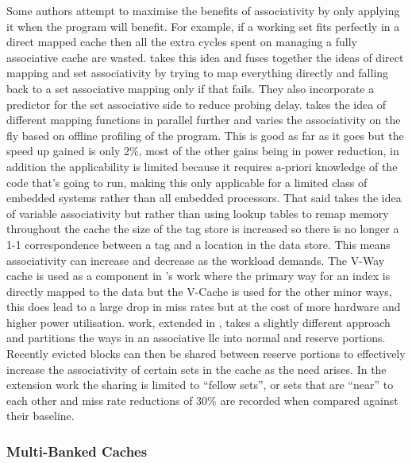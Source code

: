 Some authors attempt to maximise the benefits of associativity by only applying it when the program will benefit. For example, if a working set fits perfectly in a direct mapped cache then all the extra cycles spent on managing a fully associative cache are wasted. \citet{batsonReactiveassociativeCaches2001} takes this idea and fuses together the ideas of direct mapping and set associativity by trying to map everything directly and falling back to a set associative mapping only if that fails. They also incorporate a predictor for the set associative side to reduce probing delay. \citet{alyVariablewaySetAssociative2003} takes the idea of different mapping functions in parallel further and varies the associativity on the fly based on offline profiling of the program. This is good as far as it goes but the speed up gained is only 2\%, most of the other gains being in power reduction, in addition the applicability is limited because it requires a-priori knowledge of the code that's going to run, making this only applicable for a limited class of embedded systems rather than all embedded processors. That said \citet{qureshiVWayCacheDemandbased2005} takes the idea of variable associativity but rather than using lookup tables to remap memory throughout the cache the size of the tag store is increased so there is no longer a 1-1 correspondence between a tag and a location in the data store. This means associativity can increase and decrease as the workload demands. The V-Way cache is used as a component in \citet{deepikaHybridwayCacheMobile2011}'s work where the primary way for an index is directly mapped to the data but the V-Cache is used for the other minor ways, this does lead to a large drop in miss rates but at the cost of more hardware and higher power utilisation. \citet{dasVictimRetentionReducing2014} work, extended in \citet{dasDynamicAssociativityManagement2013}, takes a slightly different approach and partitions the ways in an associative \gls{llc} into normal and reserve portions. Recently evicted blocks can then be shared between reserve portions to effectively increase the associativity of certain sets in the cache as the need arises. In the extension work \cite{dasDynamicAssociativityManagement2013} the sharing is limited to ``fellow sets'', or sets that are ``near'' to each other and miss rate reductions of 30\% are recorded when compared against their baseline.

\subsubsection{Multi-Banked Caches}

